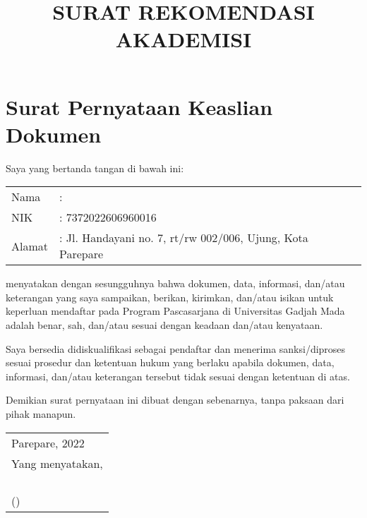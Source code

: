 \documentclass[12pt]{article}
\title{\vspace{-4ex}SURAT REKOMENDASI AKADEMISI}
\author{}
\date{\vspace{-6ex}}
\newcommand\fillin[1][3cm]{\makebox[#1]{\dotfill}}
\begin{document}
\section{Surat Pernyataan Keaslian Dokumen}

Saya yang bertanda tangan di bawah ini:

\begin{table}[htpb]
	\renewcommand{\arraystretch}{1.25}
	\begin{tabular}{p{4cm}l}
		Nama    &  : \underline{\makebox[160pt][l]{Muhammad Uliah Shafar}}  \\
		NIK     &  : 7372022606960016  \\
		Alamat  &  : Jl. Handayani no. 7, rt/rw 002/006, Ujung, Kota Parepare  \\
	\end{tabular}
\end{table}

menyatakan dengan sesungguhnya bahwa dokumen, data, informasi, dan/atau keterangan yang saya sampaikan, berikan, kirimkan, dan/atau isikan untuk keperluan mendaftar pada Program Pascasarjana di Universitas Gadjah Mada adalah benar, sah, dan/atau sesuai dengan keadaan dan/atau kenyataan.

Saya bersedia didiskualifikasi sebagai pendaftar dan menerima sanksi/diproses sesuai prosedur dan ketentuan hukum yang berlaku apabila dokumen, data, informasi, dan/atau keterangan tersebut tidak sesuai dengan ketentuan di atas.

Demikian surat pernyataan ini dibuat dengan sebenarnya, tanpa paksaan dari pihak manapun.
\vspace{\baselineskip}

{\raggedleft
	\begin{tabular}{l@{}}
		Parepare, \fillin[3cm] 2022  \\
		Yang menyatakan,  \\
		\\
		\\
		\\
		\\
		(\fillin[6cm])  \\
	\end{tabular}\par}
\end{document}
